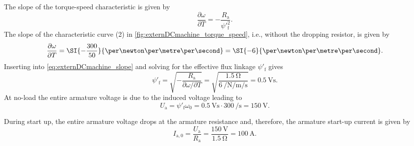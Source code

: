 \begin{solutionblock}
  The slope of the torque-speed characteristic is given by
  \begin{equation}
    \frac{\partial \omega}{\partial T} = -\frac{R_\mathrm{a}}{\psi'^2_\mathrm{f}}.
    \label{eq:externDCmachine_slope}
  \end{equation}
  The slope of the characteristic curve (2) in \autoref{fig:externDCmachine_torque_speed}, i.e., without the dropping resistor, is given by
  \begin{equation*}
    \frac{\partial \omega}{\partial T} = \SI{-\frac{300}{50}}{\per\newton\per\metre\per\second} =  \SI{-6}{\per\newton\per\metre\per\second}.
  \end{equation*}
  Inserting into \eqref{eq:externDCmachine_slope} and solving for the effective flux linkage $\psi'_\mathrm{f}$ gives
  \begin{equation}
    \psi'_\mathrm{f} = \sqrt{-\frac{R_\mathrm{a}}{\partial \omega/\partial T}} = \sqrt{\frac{\SI{1.5}{\ohm}}{\SI{6}{\per\newton\per\metre\per\second}}} = \SI{0.5}{\volt\second}.
  \end{equation}
  At no-load the entire armature voltage is due to the induced voltage leading to
  \begin{equation}
    U_\mathrm{a} = \psi'_\mathrm{f} \omega_0 = \SI{0.5}{\volt\second} \cdot \SI{300}{\per\second} = \SI{150}{\volt}.
  \end{equation}
\end{solutionblock}

\begin{solutionblock}
  During start up, the entire armature voltage drops at the armature resistance and, therefore, the armature start-up current is given by
  \begin{equation}
    I_\mathrm{a,0} = \frac{U_\mathrm{a}}{R_\mathrm{a}} = \frac{\SI{150}{\volt}}{\SI{1.5}{\ohm}} = \SI{100}{\ampere}.
  \end{equation}
\end{solutionblock}

